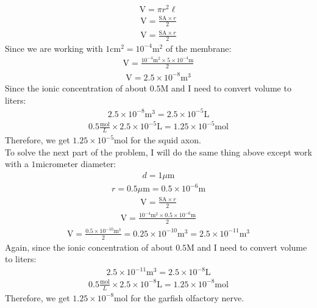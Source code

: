 \documentclass[11pt]{article}
\begin{document}
\begin{enumerate}[label=\arabic*.]
\begin{align*}
\text{V} = \pi r^2 \ell
\end{align*}
\begin{align*}
\text{V} = \frac{\text{SA} \times r} {2}
\end{align*}
\begin{align*}
\text{V} = \frac{\text{SA} \times r} {2}
\end{align*}
Since we are working with $1 \text{cm}^2 = 10^{-4} \text{m}^2$ of the membrane:
\begin{align*}
\text{V} = \frac{10^{-4} \text{m}^2 \times 5 \times 10^{-4} \text{m}} {2}
\end{align*}
\begin{align*}
\text{V} = 2.5 \times 10^{-8} \text{m}^3
\end{align*}
Since the ionic concentration of about $0.5 \text{M}$ and I need to convert volume to liters:
\begin{align*}
2.5 \times 10^{-8} \text{m}^3 = 2.5 \times 10^{-5} \text{L}
\end{align*}
\begin{align*}
0.5 \frac{\text{mol}} {L} \times 2.5 \times 10^{-5} \text{L} = 1.25 \times 10^{-5} \text{mol}
\end{align*}
Therefore, we get $1.25 \times 10^{-5} \text{mol}$ for the squid axon.
\vspace*{1\baselineskip}
\\
To solve the next part of the problem, I will do the same thing above except work with a $1 \text{micrometer}$ diameter:
\begin{align*}
d = 1 \mu \text{m}
\end{align*}
\begin{align*}
r = 0.5 \mu \text{m} = 0.5 \times 10^{-6} \text{m}
\end{align*}
\begin{align*}
\text{V} = \frac{\text{SA} \times r} {2}
\end{align*}
\begin{align*}
\text{V} = \frac{10^{-4} \text{m}^2 \times 0.5 \times 10^{-6} \text{m}} {2}
\end{align*}
\begin{align*}
\text{V} = \frac{0.5 \times 10^{-10} \text{m}^3} {2} = 0.25 \times 10^{-10} \text{m}^3 = 2.5 \times 10^{-11} \text{m}^3
\end{align*}
Again, since the ionic concentration of about $0.5 \text{M}$ and I need to convert volume to liters:
\begin{align*}
2.5 \times 10^{-11} \text{m}^3 = 2.5 \times 10^{-8} \text{L}
\end{align*}
\begin{align*}
0.5 \frac{\text{mol}} {L} \times 2.5 \times 10^{-8} \text{L} = 1.25 \times 10^{-8} \text{mol}
\end{align*}
Therefore, we get $1.25 \times 10^{-8} \text{mol}$ for the garfish olfactory nerve.




\end{enumerate}
\end{document}
